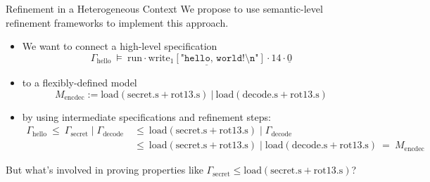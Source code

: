 \documentclass[aspectratio=1610,mathserif]{beamer}
\newcommand{\kw}[1]{\ensuremath{ \mathrm{#1} }}
\begin{document}
\begin{frame}{Refinement in a Heterogeneous Context}
  We propose to use semantic-level refinement frameworks
  to implement this approach.

  \pause
  \begin{itemize}
    \item We want to connect a high-level specification
       \[ \Gamma_\kw{hello} \: \vDash \:
          \kw{run} \cdot
        \underline{\kw{write}_1[\texttt{"hello, world!\textbackslash{}n"}]} \cdot
        14 \cdot \underline{0} \]

    \pause \item to a flexibly-defined model
       \[ M_\kw{encdec} :=
          \kw{load}(\kw{secret.s} + \kw{rot13.s})
          \:\mathbin{\mathtt{|}}\:
          \kw{load}(\kw{decode.s} + \kw{rot13.s}) \]

    \pause \item by using intermediate specifications and refinement steps:
      \begin{align*}
        \Gamma_\kw{hello}
           \:\le\: \Gamma_\kw{secret} \mathbin| \Gamma_\kw{decode}
          &\:\le\: \kw{load}(\kw{secret.s} + \kw{rot13.s}) \mathbin| \Gamma_\kw{decode} \\
          &\:\le\: \kw{load}(\kw{secret.s} + \kw{rot13.s}) \mathbin| \kw{load}(\kw{decode.s} + \kw{rot13.s})
           \:=\: M_\kw{encdec}
      \end{align*}
  \end{itemize}
  \pause
  But what's involved in proving properties like
  $\Gamma_\kw{secret} \le \kw{load}(\kw{secret.s} + \kw{rot13.s})$?
\end{frame}
\end{document}
